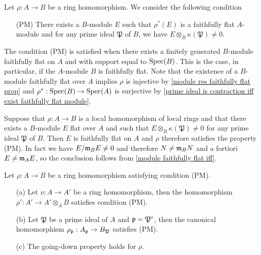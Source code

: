 Let $\rho:A\to B$ be a ring homomorphism. We consider the following condition
\begin{enumerate}[leftmargin=35pt]
\item[(PM)] There exists a $B$-module $E$ such that $\rho^*(E)$ is a faithfully flat $A$-module and for any prime ideal $\mathfrak{P}$ of $B$, we have $E\otimes_B\kappa(\mathfrak{P})\neq 0$.
\end{enumerate}
The condition (PM) is satisfied when there exists a finitely generated $B$-module faithfully flat on $A$ and with support equal to $\mathrm{Spec}(B)$. This is the case, in particular, if the $A$-module $B$ is faithfully flat. Note that the existence of a $B$-module faithfully flat over $A$ implies $\rho$ is injective by \cref{module res faithfully flat prop} and $\rho^*:\mathrm{Spec}(B)\to\mathrm{Spec}(A)$ is surjective by \cref{prime ideal is contraction iff exist faithfully flat module}.
\begin{example}\label{local ring local homomorphism condition PM}
Suppose that $\rho:A\to B$ is a local homomorphism of local rings and that there exists a $B$-module $E$ flat over $A$ and such that $E\otimes_B\kappa(\mathfrak{P})\neq 0$ for any prime ideal $\mathfrak{P}$ of $B$. Then $E$ is faithfully flat on $A$ and $\rho$ therefore satisfies the property (PM). In fact we have $E/\mathfrak{m}_BE\neq 0$ and therefore $N\neq\mathfrak{m}_BN$ and a fortiori $E\neq\mathfrak{m}_AE$, so the conclusion follows from \cref{module faithfully flat iff}.
\end{example}
\begin{proposition}\label{ring homomorphism condition PM prop}
Let $\rho:A\to B$ be a ring homomorphism satisfying condition (PM).
\begin{itemize}
\item[(a)] Let $\nu:A\to A'$ be a ring homomorphism, then the homomorphism $\rho':A'\to A'\otimes_AB$ satisfies condition (PM).
\item[(b)] Let $\mathfrak{P}$ be a prime ideal of $A$ and $\mathfrak{p}=\mathfrak{P}^c$, then the canonical homomorphism $\rho_{\mathfrak{p}}:A_{\mathfrak{p}}\to B_{\mathfrak{P}}$ satisfies (PM).
\item[(c)] The going-down property holds for $\rho$.
\end{itemize}
\end{proposition}

